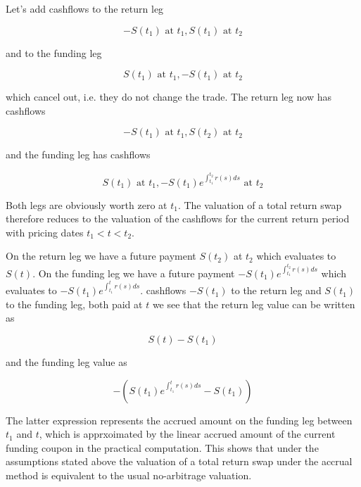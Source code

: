 Let's add cashflows to the return leg

\begin{equation}
  -S(t_1) \text{ at }  t_1, S(t_1) \text{ at } t_2
\end{equation}

and to the funding leg

\begin{equation}
 S(t_1) \text{ at }  t_1, -S(t_1) \text{ at } t_2
\end{equation}

which cancel out, i.e. they do not change the trade. The return leg now has cashflows

\begin{equation}
  -S(t_1) \text{ at } t_1, S(t_2) \text{ at } t_2
\end{equation}

and the funding leg has cashflows

\begin{equation}
  S(t_1) \text{ at } t_1, - S(t_1) e^{\int_{t_1}^{t_2} r(s) ds} \text{ at } t_2
\end{equation}

Both legs are obviously worth zero at $t_1$. The valuation of a total return swap therefore reduces to the valuation of
the cashflows for the current return period with pricing dates $t_1 < t < t_2$.

On the return leg we have a future payment $S(t_2)$ at $t_2$ which evaluates to $S(t)$. On the funding leg we have a
future payment $- S(t_1) e^{\int_{t_1}^{t_2} r(s) ds}$ which evaluates to $-S(t_1)e^{\int_{t_1}^{t} r(s) ds}$.
cashflows $-S(t_1)$ to the return leg and $S(t_1)$ to the funding leg, both paid at $t$ we see that the return leg value
can be written as

\begin{equation}
  S(t) - S(t_1)
\end{equation}

and the funding leg value as

\begin{equation}
-\left( S(t_1)e^{\int_{t_1}^{t} r(s) ds} - S(t_1) \right)
\end{equation}

The latter expression represents the accrued amount on the funding leg between $t_1$ and $t$, which is apprxoimated by
the linear accrued amount of the current funding coupon in the practical computation. This shows that under the
assumptions stated above the valuation of a total return swap under the accrual method is equivalent to the usual
no-arbitrage valuation.

